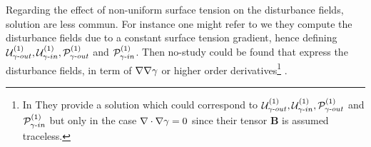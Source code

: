 Regarding the effect of non-uniform surface tension on the disturbance fields, solution are less commun. 
For instance one might refer to \citet{Subramanian_1985} we they compute the disturbance fields due to a constant surface tension gradient, hence defining  $\mathcal{U}_{\gamma\text -out}^{(1)},\mathcal{U}_{\gamma\text -in}^{(1)},\mathcal{P}_{\gamma\text -out}^{(1)}$  and $\mathcal{P}_{\gamma\text -in}^{(1)}$. 
Then no-study could be found that express the disturbance fields, in term of $\mathbf{\nabla}\mathbf{\nabla} \gamma$ or higher order derivatives\footnote{In \citet[Appendix C]{raja2010inertial} 
They provide a solution which could correspond to $\mathcal{U}_{\gamma\text -out}^{(1)},\mathcal{U}_{\gamma\text -in}^{(1)},\mathcal{P}_{\gamma\text -out}^{(1)}$  and $\mathcal{P}_{\gamma\text -in}^{(1)}$ but only in the case $\mathbf{\nabla} \cdot \mathbf{\nabla} \gamma = 0$ since their tensor \textbf{B} is assumed traceless. 
} . 


